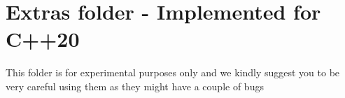 \chapter{Extras folder -\/ Implemented for C++20}
\hypertarget{md__2_users_2spirosmag_2_documents_2_algo_plus_2src_2extra_2_r_e_a_d_m_e}{}\label{md__2_users_2spirosmag_2_documents_2_algo_plus_2src_2extra_2_r_e_a_d_m_e}
\label{md__2_users_2spirosmag_2_documents_2_algo_plus_2src_2extra_2_r_e_a_d_m_e_autotoc_md28}%
%


This folder is for experimental purposes only and we kindly suggest you to be very careful using them as they might have a couple of bugs 
